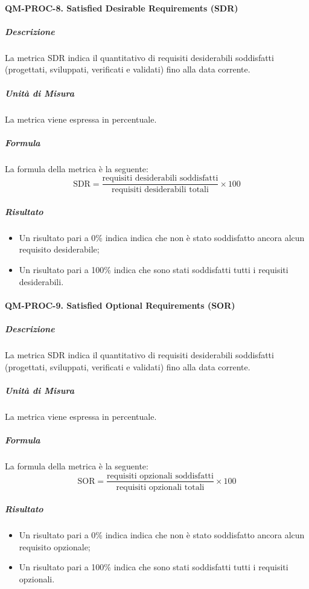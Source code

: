 			\paragraph{QM-PROC-8. Satisfied Desirable Requirements (SDR)}

				\subparagraph{Descrizione}
				La metrica SDR indica il quantitativo di requisiti desiderabili soddisfatti (progettati, sviluppati, verificati e validati) fino alla data corrente.

				\subparagraph{Unità di Misura}
				La metrica viene espressa in percentuale.

				\subparagraph{Formula}
				La formula della metrica è la seguente:
				\[
					\text{SDR} = \frac{\text{requisiti desiderabili soddisfatti}}{\text{requisiti desiderabili totali}} \times 100
				\]

				\subparagraph{Risultato}
				\begin{itemize}
					\item Un risultato pari a 0\% indica indica che non è stato soddisfatto ancora alcun requisito desiderabile;
					\item Un risultato pari a 100\% indica che sono stati soddisfatti tutti i requisiti desiderabili.
				\end{itemize}

			\paragraph{QM-PROC-9. Satisfied Optional Requirements (SOR)}

				\subparagraph{Descrizione}
				La metrica SDR indica il quantitativo di requisiti desiderabili soddisfatti (progettati, sviluppati, verificati e validati) fino alla data corrente.

				\subparagraph{Unità di Misura}
				La metrica viene espressa in percentuale.

				\subparagraph{Formula}
				La formula della metrica è la seguente:
				\[
					\text{SOR} = \frac{\text{requisiti opzionali soddisfatti}}{\text{requisiti opzionali totali}} \times 100
				\]

				\subparagraph{Risultato}
				\begin{itemize}
					\item Un risultato pari a 0\% indica indica che non è stato soddisfatto ancora alcun requisito opzionale;
					\item Un risultato pari a 100\% indica che sono stati soddisfatti tutti i requisiti opzionali.
				\end{itemize}


